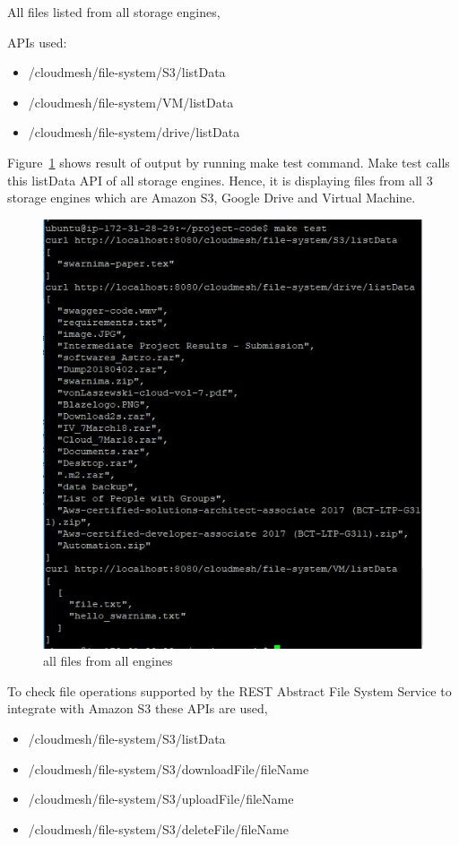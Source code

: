 All files listed from all storage engines,

APIs used:

\begin{itemize}
    \item /cloudmesh/file-system/S3/listData
    \item /cloudmesh/file-system/VM/listData
    \item /cloudmesh/file-system/drive/listData
\end{itemize}

Figure~\ref{fig:make-test} shows result of output by running make test 
command. Make test calls this listData API of all storage engines. 
Hence, it is displaying files from all 3 storage engines which are 
Amazon S3, Google Drive and Virtual Machine. 

\begin{figure}[!ht]
        \centering\includegraphics[width=\columnwidth]
        {image/make-test.JPG}
        \caption{all files from all engines}\label{fig:make-test}
\end{figure}


To check file operations supported by the REST Abstract File System
Service to integrate with Amazon S3 these APIs are used,
\begin{itemize}
    \item /cloudmesh/file-system/S3/listData
    \item /cloudmesh/file-system/S3/downloadFile/{fileName}
    \item /cloudmesh/file-system/S3/uploadFile/{fileName}
    \item /cloudmesh/file-system/S3/deleteFile/{fileName}
\end{itemize}

